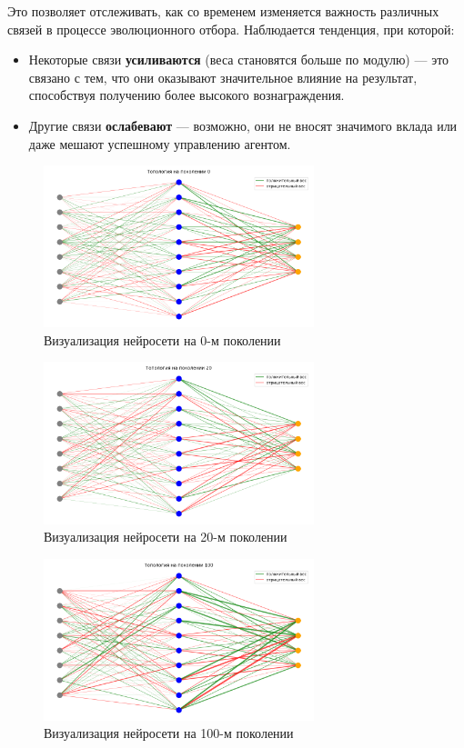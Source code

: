 \documentclass[a4paper,12pt]{article}
\begin{document}
Это позволяет отслеживать, как со временем изменяется важность различных связей в процессе эволюционного отбора. Наблюдается тенденция, при которой:
\begin{itemize}
    \item Некоторые связи \textbf{усиливаются} (веса становятся больше по модулю) — это связано с тем, что они оказывают значительное влияние на результат, способствуя получению более высокого вознаграждения.
    \item Другие связи \textbf{ослабевают} — возможно, они не вносят значимого вклада или даже мешают успешному управлению агентом.
\end{itemize}


\begin{figure}[H]
	\centering
	\includegraphics[width=0.7\textwidth]{images/topologies/topology_gen_0.png}
	\caption{Визуализация нейросети на 0-м поколении}
	\label{fig:struct_screenshot}
\end{figure}

\begin{figure}[H]
	\centering
	\includegraphics[width=0.7\textwidth]{images/topologies/topology_gen_20.png}
	\caption{Визуализация нейросети на 20-м поколении}
	\label{fig:struct_screenshot}
\end{figure}

\begin{figure}[H]
	\centering
	\includegraphics[width=0.7\textwidth]{images/topologies/topology_gen_100.png}
	\caption{Визуализация нейросети на 100-м поколении}
	\label{fig:struct_screenshot}
\end{figure}
\end{document}
